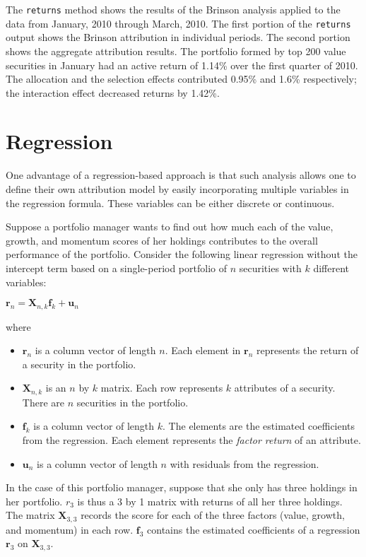 The \texttt{returns} method shows the results of the Brinson analysis
applied to the data from January, 2010 through March, 2010. The first 
portion of the \texttt{returns} output shows
the Brinson attribution in individual periods. The second portion
shows the aggregate attribution results. The portfolio formed by top
200 value securities in January had an active return of 1.14\% over
the first quarter of 2010. The allocation and the selection effects
contributed 0.95\% and 1.6\% respectively; the interaction effect
decreased returns by 1.42\%.


\section{Regression}

One advantage of a regression-based approach is that such analysis
allows one to define their own attribution model by easily
incorporating multiple variables in the regression formula. These
variables can be either discrete or continuous.

Suppose a portfolio manager wants to find out how much each of the
value, growth, and momentum scores of her holdings contributes to the
overall performance of the portfolio. Consider the following linear
regression without the intercept term based on a single-period
portfolio of $n$ securities with $k$ different variables:
\begin{center}
  $\mathbf{r}_n = \mathbf{X}_{n,k}\mathbf{f}_k + \mathbf{u}_n$
\end{center}
where 
\begin{itemize}
\item $\mathbf{r}_n$ is a column vector of length $n$. Each element in
  $\mathbf{r}_n$ represents the return of a security in the portfolio.
\item $\mathbf{X}_{n,k}$ is an $n$ by $k$ matrix. Each row represents
  $k$ attributes of a security. There are $n$ securities in the
  portfolio.
\item $\mathbf{f}_k$ is a column vector of length $k$. The elements
  are the estimated coefficients from the regression. Each element
  represents the \emph{factor return} of an attribute.
\item $\mathbf{u}_n$ is a column vector of length $n$ with residuals
  from the regression.
\end{itemize}

In the case of this portfolio manager, suppose that she only has three
holdings in her portfolio. $r_3$ is thus a 3 by 1 matrix with returns
of all her three holdings. The matrix $\mathbf{X}_{3,3}$ records the
score for each of the three factors (value, growth, and momentum) in
each row. $\mathbf{f}_3$ contains the estimated coefficients of a
regression $\mathbf{r}_3$ on $\mathbf{X}_{3, 3}$.

